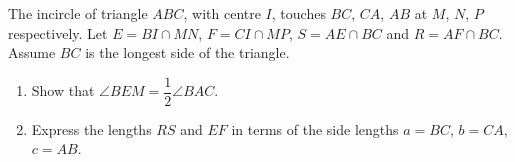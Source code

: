 The incircle of triangle $ABC$, with centre $I$, touches $BC$, $CA$, $AB$ at $M$, $N$, $P$ respectively. Let $E=BI\cap MN$, $F=CI\cap MP$, $S=AE\cap BC$ and $R=AF\cap BC$. Assume $BC$ is the longest side of the triangle.
\begin{enumerate}
\item[(a)] Show that $\angle BEM=\dfrac{1}{2}\angle BAC$.
\item[(b)] Express the lengths $RS$ and $EF$ in terms of the side lengths $a=BC$, $b=CA$, $c=AB$.
\end{enumerate}
